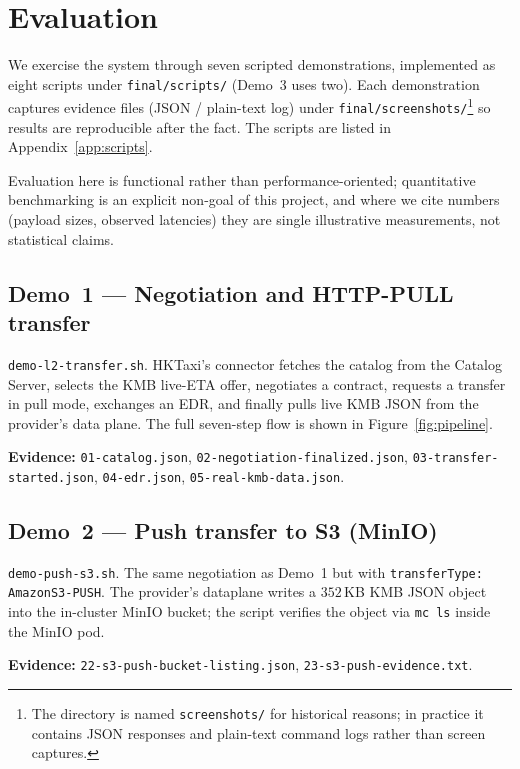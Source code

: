 \documentclass[11pt,a4paper]{article}
\DeclareRobustCommand{\code}[1]{\texttt{\small #1}}
\begin{document}
\section{Evaluation}
\label{sec:eval}

We exercise the system through seven scripted demonstrations,
implemented as eight scripts under \code{final/scripts/} (Demo~3 uses
two). Each demonstration captures evidence files (JSON / plain-text
log) under \code{final/screenshots/}\footnote{The directory is named
\code{screenshots/} for historical reasons; in practice it contains
JSON responses and plain-text command logs rather than screen
captures.} so results are reproducible after the fact. The scripts
are listed in Appendix~\ref{app:scripts}.

Evaluation here is functional rather than performance-oriented;
quantitative benchmarking is an explicit non-goal of this project, and
where we cite numbers (payload sizes, observed latencies) they are
single illustrative measurements, not statistical claims.

\subsection{Demo~1 --- Negotiation and HTTP-PULL transfer}

\code{demo-l2-transfer.sh}. HKTaxi's connector fetches the catalog from
the Catalog Server, selects the KMB live-ETA offer, negotiates a
contract, requests a transfer in pull mode, exchanges an EDR, and
finally pulls live KMB JSON from the provider's data plane. The full
seven-step flow is shown in Figure~\ref{fig:pipeline}.

\noindent\textbf{Evidence:} \code{01-catalog.json},
\code{02-negotiation-finalized.json}, \code{03-transfer-started.json},
\code{04-edr.json}, \code{05-real-kmb-data.json}.

\subsection{Demo~2 --- Push transfer to S3 (MinIO)}

\code{demo-push-s3.sh}. The same negotiation as Demo~1 but with
\code{transferType: AmazonS3-PUSH}. The provider's dataplane writes a
$352$\,KB KMB JSON object into the in-cluster MinIO bucket; the script
verifies the object via \code{mc ls} inside the MinIO pod.

\noindent\textbf{Evidence:} \code{22-s3-push-bucket-listing.json},
\code{23-s3-push-evidence.txt}.
\end{document}

